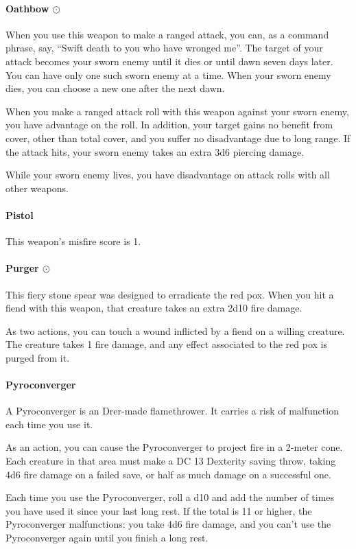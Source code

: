     \paragraph{Oathbow $\odot$}
        When you use this weapon to make a ranged attack, you can, as a command phrase, say, ``Swift death to you who have wronged me''.
        The target of your attack becomes your sworn enemy until it dies or until dawn seven days later.
        You can have only one such sworn enemy at a time.
        When your sworn enemy dies, you can choose a new one after the next dawn.

        When you make a ranged attack roll with this weapon against your sworn enemy, you have advantage on the roll.
        In addition, your target gains no benefit from cover, other than total cover, and you suffer no disadvantage due to long range.
        If the attack hits, your sworn enemy takes an extra 3d6 piercing damage.

        While your sworn enemy lives, you have disadvantage on attack rolls with all other weapons.
    \paragraph{Pistol}
        This weapon's misfire score is 1.
    \paragraph{Purger $\odot$}
        This fiery stone spear was designed to erradicate the red pox.
        When you hit a fiend with this weapon, that creature takes an extra 2d10 fire damage.

        As two actions, you can touch a wound inflicted by a fiend on a willing creature.
        The creature takes 1 fire damage, and any effect associated to the red pox is purged from it.
    \paragraph{Pyroconverger}
        A Pyroconverger is an Drer-made flamethrower.
        It carries a risk of malfunction each time you use it.

        As an action, you can cause the Pyroconverger to project fire in a 2-meter cone.
        Each creature in that area must make a DC 13 Dexterity saving throw, taking 4d6 fire damage on a failed save, or half as much damage on a successful one.

        Each time you use the Pyroconverger, roll a d10 and add the number of times you have used it since your last long rest.
        If the total is 11 or higher, the Pyroconverger malfunctions: you take 4d6 fire damage, and you can't use the Pyroconverger again until you finish a long rest.
